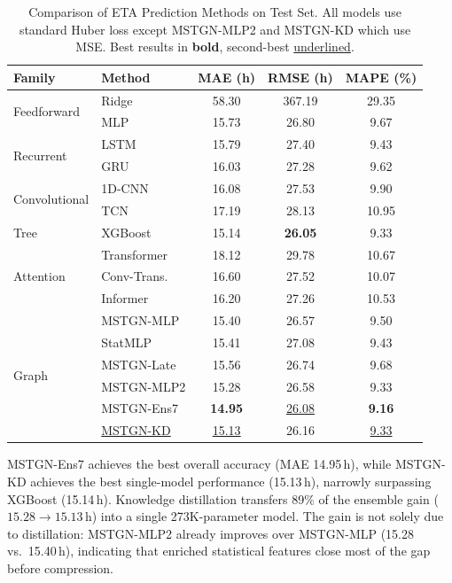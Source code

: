 \documentclass[sigconf,anonymous]{acmart}%
\begin{document}
\begin{table}[t]
    \centering
    \caption{Comparison of ETA Prediction Methods on Test Set. All models use standard Huber loss except MSTGN-MLP2 and MSTGN-KD which use MSE. Best results in \textbf{bold}, second-best \underline{underlined}.}
    \label{tab:main_results}
    \begin{tabular}{llccc}
        \toprule
        \textbf{Family} & \textbf{Method} & \textbf{MAE (h)} & \textbf{RMSE (h)} & \textbf{MAPE (\%)} \\
        \midrule
        \multirow{2}{*}{Feedforward} & Ridge & 58.30 & 367.19 & 29.35 \\
        & MLP & 15.73 & 26.80 & 9.67 \\
        \midrule
        \multirow{2}{*}{Recurrent} & LSTM & 15.79 & 27.40 & 9.43 \\
        & GRU & 16.03 & 27.28 & 9.62 \\
        \midrule
        \multirow{2}{*}{Convolutional} & 1D-CNN & 16.08 & 27.53 & 9.90 \\
        & TCN & 17.19 & 28.13 & 10.95 \\
        \midrule
        Tree & XGBoost & 15.14 & \textbf{26.05} & 9.33 \\
        \midrule
        \multirow{3}{*}{Attention} & Transformer & 18.12 & 29.78 & 10.67 \\
        & Conv-Trans. & 16.60 & 27.52 & 10.07 \\
        & Informer & 16.20 & 27.26 & 10.53 \\
        \midrule
        \multirow{7}{*}{Graph} & MSTGN-MLP & 15.40 & 26.57 & 9.50 \\
        & StatMLP & 15.41 & 27.08 & 9.43 \\
        & MSTGN-Late & 15.56 & 26.74 & 9.68 \\
        & MSTGN-MLP2 & 15.28 & 26.58 & 9.33 \\
        & MSTGN-Ens7 & \textbf{14.95} & \underline{26.08} & \textbf{9.16} \\
        & \underline{MSTGN-KD} & \underline{15.13} & 26.16 & \underline{9.33} \\
        \bottomrule
    \end{tabular}
\end{table}

MSTGN-Ens7 achieves the best overall accuracy (MAE 14.95\,h), while MSTGN-KD achieves the best single-model performance (15.13\,h), narrowly surpassing XGBoost (15.14\,h). Knowledge distillation transfers 89\% of the ensemble gain ($15.28 \to 15.13$\,h) into a single 273K-parameter model. The gain is not solely due to distillation: MSTGN-MLP2 already improves over MSTGN-MLP (15.28 vs.\ 15.40\,h), indicating that enriched statistical features close most of the gap before compression.
\end{document}
